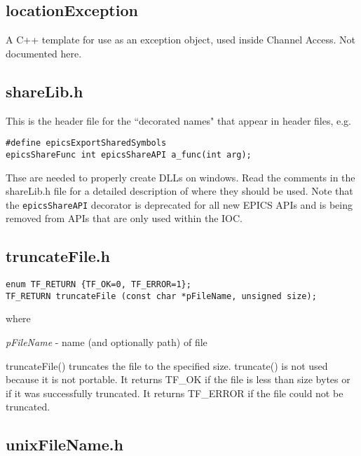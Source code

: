 \subsection{locationException}

A C++ template for use as an exception object, used inside Channel Access.
Not documented here.

\subsection{shareLib.h}

This is the header file for the ``decorated names" that appear in header files, e.g.

\begin{verbatim}
#define epicsExportSharedSymbols
epicsShareFunc int epicsShareAPI a_func(int arg);
\end{verbatim}

Thse are needed to properly create DLLs on windows.
Read the comments in the shareLib.h file for a detailed description of where they should be used.
Note that the \verb|epicsShareAPI| decorator is deprecated for all new EPICS APIs and is being removed from APIs that are only used within the IOC.

\subsection{truncateFile.h}

\begin{verbatim}
enum TF_RETURN {TF_OK=0, TF_ERROR=1};
TF_RETURN truncateFile (const char *pFileName, unsigned size);
\end{verbatim}

where

\begin{description}
\item \emph{pFileName} - name (and optionally path) of file

\end{description}

truncateFile() truncates the file to the specified size.
truncate() is not used because it is not portable.
It returns TF\_OK if the file is less than size bytes or if it was successfully truncated.
It returns TF\_ERROR if the file could not be truncated.

\subsection{unixFileName.h}

